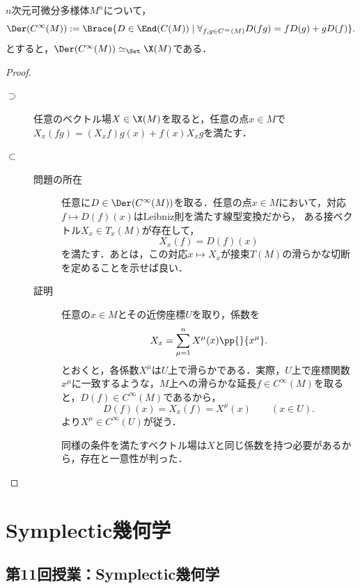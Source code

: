 \documentclass[uplatex,dvipdfmx]{jsarticle}
\begin{document}
\begin{exercise}
    $n$次元可微分多様体$M^n$について，
    \[\Der(C^\infty(M)):=\Brace{D\in\End(C(M))\mid\forall_{f,g\in C^\infty(M)} D(fg)=fD(g)+gD(f)}.\]
    とすると，$\Der(C^\infty(M))\simeq_\Set\X(M)$である．
\end{exercise}
\begin{proof}\mbox{}
    \begin{description}
        \item[$\supset$] 任意のベクトル場$X\in\X(M)$を取ると，任意の点$x\in M$で$X_x(fg)=(X_xf)g(x)+f(x)X_xg$を満たす．
        \item[$\subset$] 
        \begin{description}
            \item[問題の所在] 任意に$D\in\Der(C^\infty(M))$を取る．任意の点$x\in M$において，対応$f\mapsto D(f)(x)$はLeibniz則を満たす線型変換だから，
            ある接ベクトル$X_x\in T_x(M)$が存在して，
            \[X_x(f)=D(f)(x)\]
            を満たす．あとは，この対応$x\mapsto X_x$が接束$T(M)$の滑らかな切断を定めることを示せば良い．
            \item[証明] 任意の$x\in M$とその近傍座標$U$を取り，係数を
            \[X_x=\sum_{\mu=1}^nX^\mu(x)\pp{}{x^\mu}.\]
            とおくと，各係数$X^\mu$は$U$上で滑らかである．実際，$U$上で座標関数$x^\mu$に一致するような，$M$上への滑らかな延長$f\in C^\infty(M)$を取ると，$D(f)\in C^\infty(M)$であるから，
            \[D(f)(x)=X_x(f)=X^\mu(x)\qquad(x\in U).\]
            より$X^\mu\in C^\infty(U)$が従う．

            同様の条件を満たすベクトル場は$X$と同じ係数を持つ必要があるから，存在と一意性が判った．
        \end{description}
    \end{description}
\end{proof}

\section{Symplectic幾何学}

\subsection{第11回授業：Symplectic幾何学}
\end{document}
